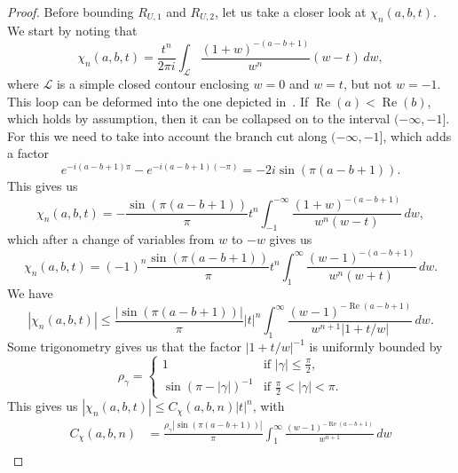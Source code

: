 \documentclass[11pt]{article}
\DeclareMathOperator{\real}{Re}
\begin{document}
\begin{proof}
  Before bounding \(R_{U,1}\) and \(R_{U,2}\), let us take a closer
  look at \(\chi_{n}(a, b, t)\). We start by noting that
  \begin{equation*}
    \chi_{n}(a, b, t) = \frac{t^{n}}{2\pi i}\int_{\mathcal{L}} \frac{(1 + w)^{-(a - b + 1)}}{w^{n}}(w - t)\,dw,
  \end{equation*}
  where \(\mathcal{L}\) is a simple closed contour enclosing \(w = 0\)
  and \(w = t\), but not \(w = -1\). This loop can be deformed into
  the one depicted in~\cite[Figure 1]{Olver1991b}. If
  \(\real(a) < \real(b)\), which holds by assumption, then it can be
  collapsed on to the interval \((-\infty, -1]\). For this we need to
  take into account the branch cut along \((-\infty, -1]\), which adds
  a factor
  \begin{equation*}
    e^{-i(a - b + 1)\pi} - e^{-i(a - b + 1)(-\pi)} = -2i\sin(\pi(a - b + 1)).
  \end{equation*}
  This gives us
  \begin{equation*}
    \chi_{n}(a, b, t) = -\frac{\sin(\pi(a - b + 1))}{\pi}t^{n}\int_{-1}^{-\infty} \frac{(1 + w)^{-(a - b + 1)}}{w^{n}(w - t)}\,dw,
  \end{equation*}
  which after a change of variables from \(w\) to \(-w\) gives us
  \begin{equation*}
    \chi_{n}(a, b, t) = (-1)^{n}\frac{\sin(\pi(a - b + 1))}{\pi}t^{n}\int_{1}^{\infty} \frac{(w - 1)^{-(a - b + 1)}}{w^{n}(w + t)}\,dw.
  \end{equation*}
  We have
  \begin{equation*}
    |\chi_{n}(a, b, t)| \leq \frac{|\sin(\pi(a - b + 1))|}{\pi}|t|^{n}\int_{1}^{\infty} \frac{(w - 1)^{-\real(a - b + 1)}}{w^{n + 1}|1 + t / w|}\,dw.
  \end{equation*}
  Some trigonometry gives us that the factor \(|1 + t / w|^{-1}\) is
  uniformly bounded by
  \begin{equation*}
    \rho_\gamma =
    \begin{cases}
      1 & \text{if } |\gamma| \leq \frac{\pi}{2}, \\
      \sin(\pi - |\gamma|)^{-1} & \text{if } \frac{\pi}{2} < |\gamma| < \pi.
    \end{cases}
  \end{equation*}
  This gives us \(|\chi_{n}(a, b, t)| \leq C_{\chi}(a, b, n) |t|^n\),
  with
  \begin{align*}
    C_{\chi}(a, b, n)
    &= \frac{\rho_{\gamma}|\sin(\pi(a - b + 1))|}{\pi}
      \int_{1}^{\infty} \frac{(w - 1)^{-\real(a - b + 1)}}{w^{n + 1}}\,dw\\

\end{align*}
\end{proof}
\end{document}
